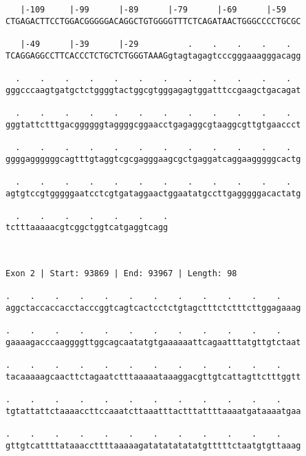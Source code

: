 \documentclass{article}
\begin{document}
\begin{Verbatim}
   |-109     |-99      |-89      |-79      |-69      |-59   
CTGAGACTTCCTGGACGGGGGACAGGCTGTGGGGTTTCTCAGATAACTGGGCCCCTGCGC
                                                            
   |-49      |-39      |-29          .    .    .    .    .  
TCAGGAGGCCTTCACCCTCTGCTCTGGGTAAAGgtagtagagtcccgggaaagggacagg
                                                            
  .    .    .    .    .    .    .    .    .    .    .    .  
gggcccaagtgatgctctggggtactggcgtgggagagtggatttccgaagctgacagat
                                                            
  .    .    .    .    .    .    .    .    .    .    .    .  
gggtattctttgacggggggtaggggcggaacctgagaggcgtaaggcgttgtgaaccct
                                                            
  .    .    .    .    .    .    .    .    .    .    .    .  
ggggaggggggcagtttgtaggtcgcgagggaagcgctgaggatcaggaagggggcactg
                                                            
  .    .    .    .    .    .    .    .    .    .    .    .  
agtgtccgtgggggaatcctcgtgataggaactggaatatgccttgagggggacactatg
                                                            
  .    .    .    .    .    .    .
tctttaaaaacgtcggctggtcatgaggtcagg
                                 
                                 
 
Exon 2 | Start: 93869 | End: 93967 | Length: 98
 
.    .    .    .    .    .    .    .    .    .    .    .    
aggctaccaccacctacccggtcagtcactcctctgtagctttctctttcttggagaaag
                                                            
.    .    .    .    .    .    .    .    .    .    .    .    
gaaaagacccaaggggttggcagcaatatgtgaaaaaattcagaatttatgttgtctaat
                                                            
.    .    .    .    .    .    .    .    .    .    .    .    
tacaaaaagcaacttctagaatctttaaaaataaaggacgttgtcattagttctttggtt
                                                            
.    .    .    .    .    .    .    .    .    .    .    .    
tgtattattctaaaaccttccaaatcttaaatttactttattttaaaatgataaaatgaa
                                                            
.    .    .    .    .    .    .    .    .    .    .    .    
gttgtcattttataaaccttttaaaaagatatatatatatgtttttctaatgtgttaaag
                                                            

\end{Verbatim}
\end{document}
